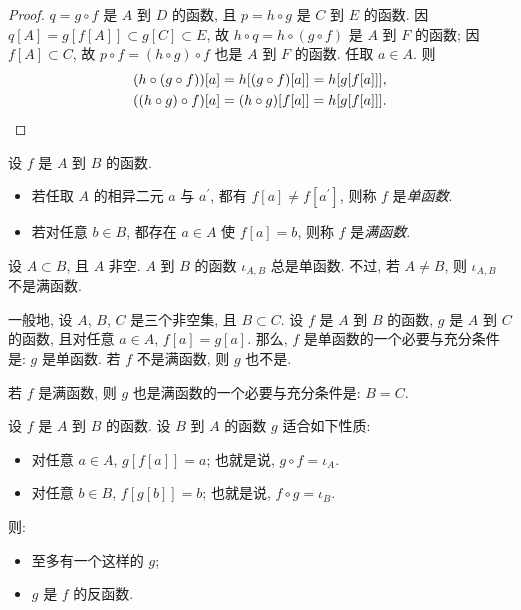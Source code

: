 \begin{proof}
    $q = g \circ f$ 是 $A$ 到 $D$ 的函数, 且 $p = h \circ g$ 是 $C$ 到 $E$ 的函数. 因 $q[A] = g[f[A]] \subset g[C] \subset E$, 故 $h \circ q = h \circ (g \circ f)$ 是 $A$ 到 $F$ 的函数; 因 $f[A] \subset C$, 故 $p \circ f = (h \circ g) \circ f$ 也是 $A$ 到 $F$ 的函数. 任取 $a \in A$. 则
    \begin{align*}
         & (h \circ (g \circ f))[a] = h[(g \circ f)[a]] = h[g[f[a]]],          \\
         & ((h \circ g) \circ f)[a] = (h \circ g)[f[a]] = h[g[f[a]]]. \qedhere
    \end{align*}
\end{proof}

\begin{definition}
    设 $f$ 是 $A$ 到 $B$ 的函数.
    \begin{itemize}
        \item 若任取 $A$ 的相异二元 $a$ 与 $a^{\prime}$, 都有 $f[a] \neq f[a^{\prime}]$, 则称 $f$ 是\emph{单函数}.
        \item 若对任意 $b \in B$, 都存在 $a \in A$ 使 $f[a] = b$, 则称 $f$ 是\emph{满函数}.
    \end{itemize}
\end{definition}

\begin{example}
    设 $A \subset B$, 且 $A$ 非空. $A$ 到 $B$ 的函数 $\iota_{A,B}$ 总是单函数. 不过, 若 $A \neq B$, 则 $\iota_{A,B}$ 不是满函数.
\end{example}

\begin{remark}
    一般地, 设 $A$, $B$, $C$ 是三个非空集, 且 $B \subset C$. 设 $f$ 是 $A$ 到 $B$ 的函数, $g$ 是 $A$ 到 $C$ 的函数, 且对任意 $a \in A$, $f[a] = g[a]$. 那么, $f$ 是单函数的一个必要与充分条件是: $g$ 是单函数. 若 $f$ 不是满函数, 则 $g$ 也不是.

    若 $f$ 是满函数, 则 $g$ 也是满函数的一个必要与充分条件是: $B = C$.
\end{remark}

\begin{theorem}
    设 $f$ 是 $A$ 到 $B$ 的函数. 设 $B$ 到 $A$ 的函数 $g$ 适合如下性质:
    \begin{itemize}
        \item 对任意 $a \in A$, $g[f[a]] = a$; 也就是说, $g \circ f = \iota_A$.
        \item 对任意 $b \in B$, $f[g[b]] = b$; 也就是说, $f \circ g = \iota_B$.
    \end{itemize}
    则:
    \begin{itemize}
        \item 至多有一个这样的 $g$;
        \item $g$ 是 $f$ 的反函数.
    \end{itemize}
\end{theorem}

